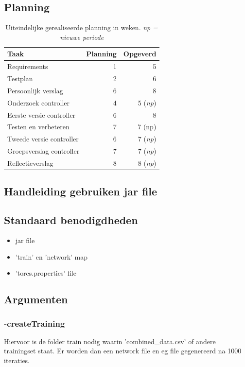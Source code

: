 \documentclass{article}
\begin{document}
\pagebreak
\subsection{Planning}
\label{uiteind-plan}
\begin{table}[h!]
\begin{tabular}{lrr}
 \textbf{Taak} & \textbf{Planning} & \textbf{Opgeverd} \\ \hline
 Requirements & 1 & 5 \\
 Testplan & 2 & 6 \\
 Persoonlijk verslag & 6 & 8 \\
 Onderzoek controller & 4 & 5 (\textit{np}) \\
 Eerste versie controller & 6 & 8 \\
 Testen en verbeteren & 7 & 7 (np) \\
 Tweede versie controller & 6 & 7 (\textit{np}) \\
 Groepsverslag controller & 7 & 7 (\textit{np}) \\
 Reflectieverslag & 8 & 8 (\textit{np})  \\
\end{tabular}
\caption{Uiteindelijke gerealiseerde planning in weken. \textit{np = nieuwe periode}}
\end{table}
\newpage
\subsection{Handleiding gebruiken jar file}
\subsection*{Standaard benodigdheden}
\begin{itemize}
\item jar file
\item 'train'  en 'network' map
\item 'torcs.properties' file
\end{itemize}

\subsection*{Argumenten}
\subsubsection*{-createTraining}
Hiervoor is de folder train nodig waarin 'combined\_data.csv' of andere trainingset staat. Er worden dan een network file en eg file gegenereerd na 1000 iteraties.
\end{document}
